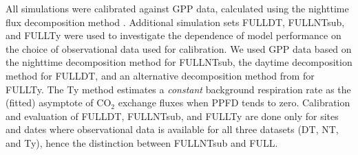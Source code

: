 \documentclass{myreport}
\begin{document}
All simulations were calibrated against GPP data, calculated using the nighttime flux decomposition method \citep{Reichstein2005-mp}. Additional simulation sets FULL\textunderscore DT, FULL\textunderscore NTsub, and FULL\textunderscore Ty were used to investigate the dependence of model performance on the choice of observational data used for calibration. We used GPP data based on the nighttime decomposition method \citep{Reichstein2005-mp} for FULL\textunderscore NTsub, the daytime decomposition method \citep{lasslop10} for FULL\textunderscore DT, and an alternative decomposition method from \citet{wang17natpl} for FULL\textunderscore Ty. The Ty method estimates a \textit{constant} background respiration rate as the (fitted) asymptote of CO$_2$ exchange fluxes when PPFD tends to zero. Calibration and evaluation of FULL\textunderscore DT, FULL\textunderscore NTsub, and FULL\textunderscore Ty are done only for sites and dates where observational data is available for all three datasets (DT, NT, and Ty), hence the distinction between FULL\textunderscore NTsub and FULL. 
\end{document}
